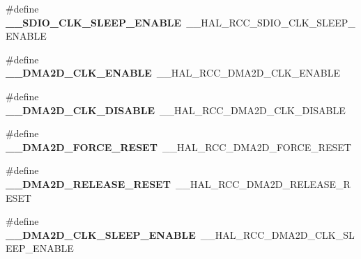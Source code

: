 \begin{DoxyCompactItemize}
\item 
\hypertarget{group___h_a_l___r_c_c___aliased_ga9b44283bbb062d9b9547e1fbcfb2e46a}{\#define {\bfseries \-\_\-\-\_\-\-S\-D\-I\-O\-\_\-\-C\-L\-K\-\_\-\-S\-L\-E\-E\-P\-\_\-\-E\-N\-A\-B\-L\-E}~\-\_\-\-\_\-\-H\-A\-L\-\_\-\-R\-C\-C\-\_\-\-S\-D\-I\-O\-\_\-\-C\-L\-K\-\_\-\-S\-L\-E\-E\-P\-\_\-\-E\-N\-A\-B\-L\-E}\label{group___h_a_l___r_c_c___aliased_ga9b44283bbb062d9b9547e1fbcfb2e46a}

\item 
\hypertarget{group___h_a_l___r_c_c___aliased_gae062b5b5fc826afc4ad7a44434c4ce6d}{\#define {\bfseries \-\_\-\-\_\-\-D\-M\-A2\-D\-\_\-\-C\-L\-K\-\_\-\-E\-N\-A\-B\-L\-E}~\-\_\-\-\_\-\-H\-A\-L\-\_\-\-R\-C\-C\-\_\-\-D\-M\-A2\-D\-\_\-\-C\-L\-K\-\_\-\-E\-N\-A\-B\-L\-E}\label{group___h_a_l___r_c_c___aliased_gae062b5b5fc826afc4ad7a44434c4ce6d}

\item 
\hypertarget{group___h_a_l___r_c_c___aliased_gab1531390432dc2c531464eb1507dcf3f}{\#define {\bfseries \-\_\-\-\_\-\-D\-M\-A2\-D\-\_\-\-C\-L\-K\-\_\-\-D\-I\-S\-A\-B\-L\-E}~\-\_\-\-\_\-\-H\-A\-L\-\_\-\-R\-C\-C\-\_\-\-D\-M\-A2\-D\-\_\-\-C\-L\-K\-\_\-\-D\-I\-S\-A\-B\-L\-E}\label{group___h_a_l___r_c_c___aliased_gab1531390432dc2c531464eb1507dcf3f}

\item 
\hypertarget{group___h_a_l___r_c_c___aliased_ga8e258b69f763083aca55602dc6d61353}{\#define {\bfseries \-\_\-\-\_\-\-D\-M\-A2\-D\-\_\-\-F\-O\-R\-C\-E\-\_\-\-R\-E\-S\-E\-T}~\-\_\-\-\_\-\-H\-A\-L\-\_\-\-R\-C\-C\-\_\-\-D\-M\-A2\-D\-\_\-\-F\-O\-R\-C\-E\-\_\-\-R\-E\-S\-E\-T}\label{group___h_a_l___r_c_c___aliased_ga8e258b69f763083aca55602dc6d61353}

\item 
\hypertarget{group___h_a_l___r_c_c___aliased_ga90c57750464803782f28e36f4949995e}{\#define {\bfseries \-\_\-\-\_\-\-D\-M\-A2\-D\-\_\-\-R\-E\-L\-E\-A\-S\-E\-\_\-\-R\-E\-S\-E\-T}~\-\_\-\-\_\-\-H\-A\-L\-\_\-\-R\-C\-C\-\_\-\-D\-M\-A2\-D\-\_\-\-R\-E\-L\-E\-A\-S\-E\-\_\-\-R\-E\-S\-E\-T}\label{group___h_a_l___r_c_c___aliased_ga90c57750464803782f28e36f4949995e}

\item 
\hypertarget{group___h_a_l___r_c_c___aliased_gadaa25978a7572300aeac9a3d6d57d8ce}{\#define {\bfseries \-\_\-\-\_\-\-D\-M\-A2\-D\-\_\-\-C\-L\-K\-\_\-\-S\-L\-E\-E\-P\-\_\-\-E\-N\-A\-B\-L\-E}~\-\_\-\-\_\-\-H\-A\-L\-\_\-\-R\-C\-C\-\_\-\-D\-M\-A2\-D\-\_\-\-C\-L\-K\-\_\-\-S\-L\-E\-E\-P\-\_\-\-E\-N\-A\-B\-L\-E}\label{group___h_a_l___r_c_c___aliased_gadaa25978a7572300aeac9a3d6d57d8ce}


\end{DoxyCompactItemize}
